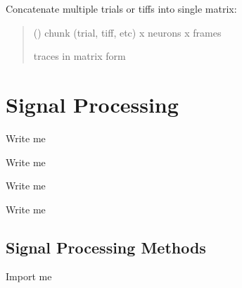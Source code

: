 \documentclass[letterpaper,10pt,english]{sphinxmanual}
\begin{document}
\begin{fulllineitems}
\label{\detokenize{CalSciPy.reorganization:CalSciPy.reorganization.merge_tensor}}
\pysigstartsignatures
{}
\pysigstopsignatures
\sphinxAtStartPar
Concatenate multiple trials or tiffs into single matrix:
\begin{quote}\begin{description}
\sphinxAtStartPar
{} () \sphinxhyphen{}\sphinxhyphen{} chunk (trial, tiff, etc) x neurons x frames

\sphinxAtStartPar
traces in matrix form

\sphinxAtStartPar
{}

\end{description}\end{quote}

\end{fulllineitems}



\section{Signal Processing}
\label{\detokenize{Sub-Packages:signal-processing}}\label{\detokenize{Sub-Packages:signal-processing-module}}
\begin{DUlineblock}{0em}
\item[] Write me
\item[] Write me
\item[] Write me
\item[] Write me
\end{DUlineblock}


\subsection{Signal Processing Methods}
\label{\detokenize{Sub-Packages:signal-processing-methods}}
\begin{DUlineblock}{0em}
\item[] Import me
\end{DUlineblock}
\end{document}
